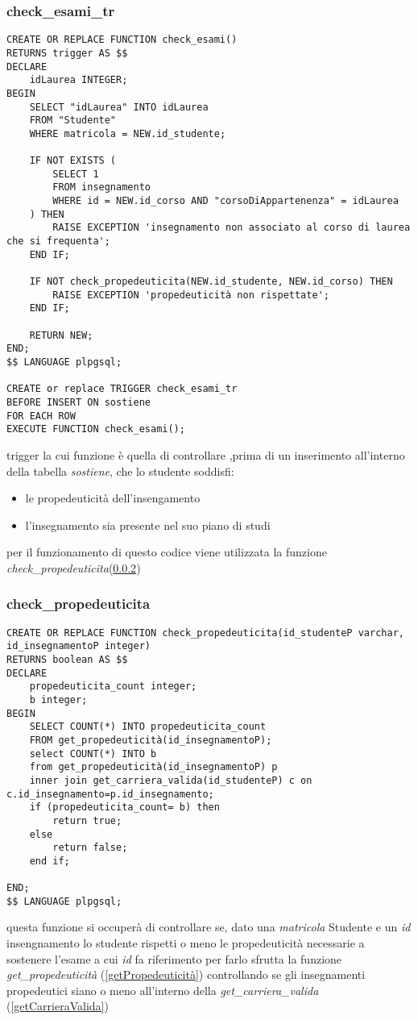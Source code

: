 \subsubsection{check\_esami\_tr}\label{checkesamitr}
\begin{lstlisting}[style=sqlStyle]
CREATE OR REPLACE FUNCTION check_esami()
RETURNS trigger AS $$
DECLARE
    idLaurea INTEGER;
BEGIN 
    SELECT "idLaurea" INTO idLaurea
    FROM "Studente"
    WHERE matricola = NEW.id_studente;

    IF NOT EXISTS (
        SELECT 1  
        FROM insegnamento 
        WHERE id = NEW.id_corso AND "corsoDiAppartenenza" = idLaurea
    ) THEN 
        RAISE EXCEPTION 'insegnamento non associato al corso di laurea che si frequenta';
    END IF;

    IF NOT check_propedeuticita(NEW.id_studente, NEW.id_corso) THEN
        RAISE EXCEPTION 'propedeuticità non rispettate';
    END IF;

    RETURN NEW;
END;
$$ LANGUAGE plpgsql;

CREATE or replace TRIGGER check_esami_tr
BEFORE INSERT ON sostiene
FOR EACH ROW 
EXECUTE FUNCTION check_esami();
\end{lstlisting}
trigger la cui funzione è quella di controllare ,prima di un inserimento all'interno della tabella \textit{sostiene}, che lo studente soddisfi:
\begin{itemize}
    \item le propedeuticità dell'insengamento 
    \item l'insegnamento sia presente nel suo piano di studi 
\end{itemize}
per il funzionamento di questo codice viene utilizzata la funzione \textit{check\_propedeuticita}(\ref{checkPropedeuticità})

\subsubsection{check\_propedeuticita}\label{checkPropedeuticità}
\begin{lstlisting}[style=sqlStyle]
CREATE OR REPLACE FUNCTION check_propedeuticita(id_studenteP varchar, id_insegnamentoP integer)
RETURNS boolean AS $$
DECLARE
    propedeuticita_count integer;
    b integer;
BEGIN
    SELECT COUNT(*) INTO propedeuticita_count
    FROM get_propedeuticità(id_insegnamentoP);
    select COUNT(*) INTO b
    from get_propedeuticità(id_insegnamentoP) p 
    inner join get_carriera_valida(id_studenteP) c on c.id_insegnamento=p.id_insegnamento; 
    if (propedeuticita_count= b) then
    	return true;
    else
    	return false;
    end if;
  	
END;
$$ LANGUAGE plpgsql;
\end{lstlisting}
questa funzione si occuperà di controllare se, dato una \textit{matricola} Studente e un \textit{id} insengnamento lo studente rispetti  o meno le propedeuticità necessarie a sostenere l'esame a cui \textit{id} fa riferimento per farlo sfrutta la funzione \textit{get\_propedeuticità} (\ref{getPropedeuticità}) controllando se gli insegnamenti propedeutici siano o meno all'interno della \textit{get\_carriera\_valida} (\ref{getCarrieraValida})

